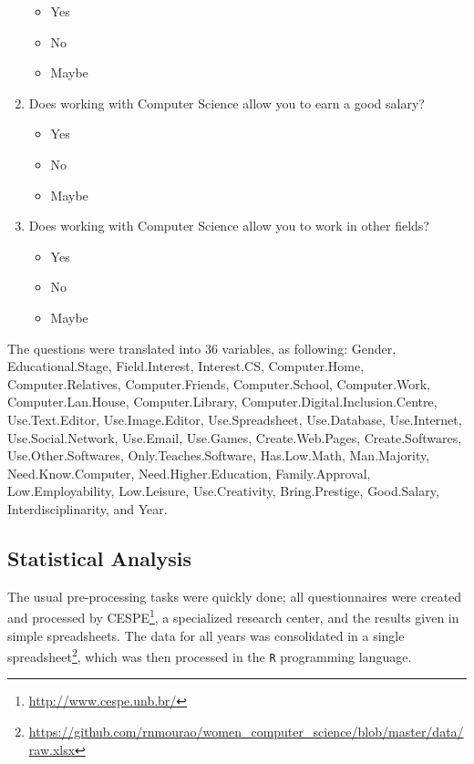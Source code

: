 \begin{enumerate}
\begin{itemize}
            \item Yes
            \item No
            \item Maybe
        \end{itemize}    
    \item Does working with Computer Science allow you to earn a good salary?
        \begin{itemize}
            \item Yes
            \item No
            \item Maybe
        \end{itemize}
    \item Does working with Computer Science allow you to work in other fields?
        \begin{itemize}
            \item Yes
            \item No
            \item Maybe
        \end{itemize}                                    
\end{enumerate}

The questions were translated into 36 variables, as following: Gender, Educational.Stage, Field.Interest, Interest.CS, Computer.Home, Computer.Relatives, Computer.Friends, Computer.School, Computer.Work, Computer.Lan.House, Computer.Library, Computer.Digital.Inclusion.Centre, Use.Text.Editor, Use.Image.Editor, Use.Spreadsheet, Use.Database, Use.Internet, Use.Social.Network, Use.Email, Use.Games, Create.Web.Pages, Create.Softwares, Use.Other.Softwares, Only.Teaches.Software, Has.Low.Math, Man.Majority, Need.Know.Computer, Need.Higher.Education, Family.Approval, Low.Employability, Low.Leisure, Use.Creativity, Bring.Prestige, Good.Salary, Interdisciplinarity, and Year.


\subsection{Statistical Analysis}\label{sec:mining:stat}%
The usual pre-processing tasks were quickly done; all questionnaires were created and processed by CESPE\footnote{\url{http://www.cespe.unb.br/}}, a specialized research center, and the results given in simple spreadsheets. The data for all years was consolidated in a single spreadsheet\footnote{\url{https://github.com/rnmourao/women\_computer\_science/blob/master/data/raw.xlsx}}, which was then processed in the \texttt{R} programming language.

